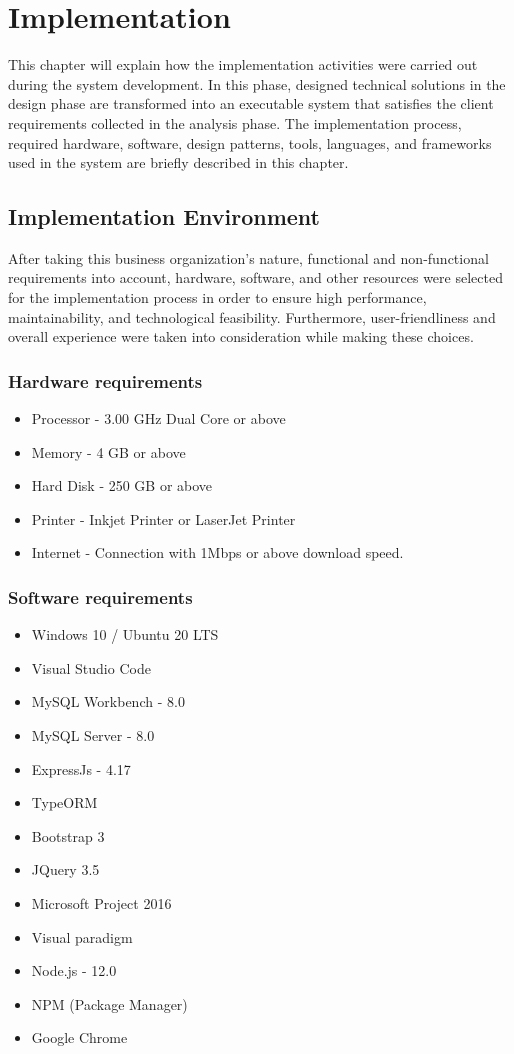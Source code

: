\documentclass[12pt]{report}
\begin{document}
\newpage
\chapter{Implementation}
This chapter will explain how the implementation activities were carried out during the system development. In this phase, designed technical solutions in the design phase are transformed into an executable system that satisfies the client requirements collected in the analysis phase. The implementation process, required hardware, software, design patterns, tools, languages, and frameworks used in the system are briefly described in this chapter.

\section{Implementation Environment}
After taking this business organization's nature, functional and non-functional requirements into account, hardware, software, and other resources were selected for the implementation process in order to ensure high performance, maintainability, and technological feasibility. Furthermore, user-friendliness and overall experience were taken into consideration while making these choices.

\subsection{Hardware requirements}
\begin{itemize}
	\item Processor - 3.00 GHz Dual Core or above
	\item Memory - 4 GB or above
	\item Hard Disk - 250 GB or above
	\item Printer - Inkjet Printer or LaserJet Printer
	\item Internet - Connection with 1Mbps or above download speed.
\end{itemize}

\subsection{Software requirements}
\begin{itemize}
	\item Windows 10 / Ubuntu 20 LTS
	\item Visual Studio Code
	\item MySQL Workbench - 8.0
	\item MySQL Server - 8.0
	\item ExpressJs - 4.17
	\item TypeORM
	\item Bootstrap 3
	\item JQuery 3.5
	\item Microsoft Project 2016
	\item Visual paradigm
	\item Node.js - 12.0
	\item NPM (Package Manager)
	\item Google Chrome
\end{itemize}
\end{document}
